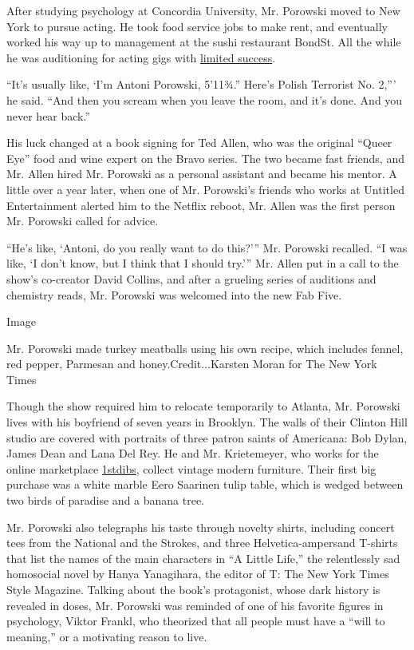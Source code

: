 After studying psychology at Concordia University, Mr. Porowski moved to
New York to pursue acting. He took food service jobs to make rent, and
eventually worked his way up to management at the sushi restaurant
BondSt. All the while he was auditioning for acting gigs with
\href{http://www.imdb.com/name/nm3307410/}{limited success}.

``It's usually like, `I'm Antoni Porowski, 5'11¾.'' Here's Polish
Terrorist No. 2,''' he said. ``And then you scream when you leave the
room, and it's done. And you never hear back.''

His luck changed at a book signing for Ted Allen, who was the original
``Queer Eye'' food and wine expert on the Bravo series. The two became
fast friends, and Mr. Allen hired Mr. Porowski as a personal assistant
and became his mentor. A little over a year later, when one of Mr.
Porowski's friends who works at Untitled Entertainment alerted him to
the Netflix reboot, Mr. Allen was the first person Mr. Porowski called
for advice.

``He's like, `Antoni, do you really want to do this?''' Mr. Porowski
recalled. ``I was like, `I don't know, but I think that I should try.'''
Mr. Allen put in a call to the show's co-creator David Collins, and
after a grueling series of auditions and chemistry reads, Mr. Porowski
was welcomed into the new Fab Five.

Image

Mr. Porowski made turkey meatballs using his own recipe, which includes
fennel, red pepper, Parmesan and honey.Credit...Karsten Moran for The
New York Times

Though the show required him to relocate temporarily to Atlanta, Mr.
Porowski lives with his boyfriend of seven years in Brooklyn. The walls
of their Clinton Hill studio are covered with portraits of three patron
saints of Americana: Bob Dylan, James Dean and Lana Del Rey. He and Mr.
Krietemeyer, who works for the online marketplace
\href{https://www.1stdibs.com/}{1stdibs}, collect vintage modern
furniture. Their first big purchase was a white marble Eero Saarinen
tulip table, which is wedged between two birds of paradise and a banana
tree.

Mr. Porowski also telegraphs his taste through novelty shirts, including
concert tees from the National and the Strokes, and three
Helvetica-ampersand T-shirts that list the names of the main characters
in ``A Little Life,'' the relentlessly sad homosocial novel by Hanya
Yanagihara, the editor of T: The New York Times Style Magazine. Talking
about the book's protagonist, whose dark history is revealed in doses,
Mr. Porowski was reminded of one of his favorite figures in psychology,
Viktor Frankl, who theorized that all people must have a ``will to
meaning,'' or a motivating reason to live.

